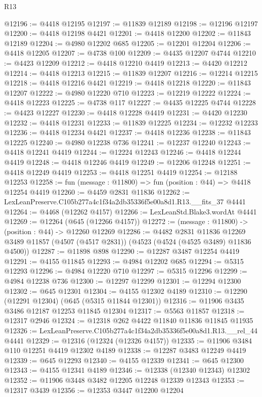 \begin{lexlean}{R13}
\begin{coremodule}
@12196 := @4418 @12195
@12197 := @11839 @12189
@12198 := @12196 @12197
@12200 := @4418 @12198 @4421
@12201 := @4418 @12200
@12202 := @11843 @12189
@12204 := @4980 @12202 @685
@12205 := @12201 @12204
@12206 := @4418 @12205
@12207 := @4738 @100
@12209 := @4435 @12207 @4744
@12210 := @4423 @12209
@12212 := @4418 @12210 @4419
@12213 := @4420 @12212
@12214 := @4418 @12213
@12215 := @11839 @12207
@12216 := @12214 @12215
@12218 := @4418 @12216 @4421
@12219 := @4418 @12218
@12220 := @11843 @12207
@12222 := @4980 @12220 @710
@12223 := @12219 @12222
@12224 := @4418 @12223
@12225 := @4738 @117
@12227 := @4435 @12225 @4744
@12228 := @4423 @12227
@12230 := @4418 @12228 @4419
@12231 := @4420 @12230
@12232 := @4418 @12231
@12233 := @11839 @12225
@12234 := @12232 @12233
@12236 := @4418 @12234 @4421
@12237 := @4418 @12236
@12238 := @11843 @12225
@12240 := @4980 @12238 @736
@12241 := @12237 @12240
@12243 := @4418 @12241 @4419
@12244 := @12224 @12243
@12246 := @4418 @12244 @4419
@12248 := @4418 @12246 @4419
@12249 := @12206 @12248
@12251 := @4418 @12249 @4419
@12253 := @4418 @12251 @4419
@12254 := @12188 @12253
@12258 := fun (message : @11800) => fun (position : @44) => @4418 @12254 @4419
@12260 := @4459 @2831 @11836
@12262 := LexLeanPreserve.C105b277a4c1f34a2db35336f5e00a8d1.R13.__fits_37 @4441
@12264 := @4468 (@12262 @4157)
@12266 := LexLeanStd.Blake3.wordAt @4441
@12269 := @12264 (@645 (@12266 @4157))
@12272 := (message : @11800) -> (position : @44) -> @12260 @12269
@12286 := @4482
    @2831
    @11836
    @12269
    @3489
    @11857
    (@4507 (@4517 @2831))
    (@4523 (@4524 (@4525 @3489) @11836 @4500))
@12287 := @11898 @898
@12290 := @12287 @3487 @12254 @4419
@12291 := @4155 @11845
@12293 := @4984 @12202 @685
@12294 := @5315 @12293
@12296 := @4984 @12220 @710
@12297 := @5315 @12296
@12299 := @4984 @12238 @736
@12300 := @12297 @12299
@12301 := @12294 @12300
@12302 := @645 @12301
@12304 := @4155 @12302 @4189
@12310 := @12290 (@12291 @12304) (@645 (@5315 @11844 @12301))
@12316 := @11906 @3435 @3486 @12187 @12253 @11845 @12304
@12317 := @5563 @11857
@12318 := @12317 @2946
@12324 := @12318 @262 @4422 @11840 @11836 @11845 @11935
@12326 := LexLeanPreserve.C105b277a4c1f34a2db35336f5e00a8d1.R13.__rel_44 @4441
@12329 := @12316 (@12324 (@12326 @4157))
@12335 := @11906 @3484 @110 @12251 @4419 @12302 @4189
@12338 := @12287 @3483 @12249 @4419
@12339 := @645 @12293
@12340 := @4155 @12339
@12341 := @645 @12300
@12343 := @4155 @12341 @4189
@12346 := @12338 (@12340 @12343) @12302
@12352 := @11906 @3448 @3482 @12205 @12248 @12339 @12343
@12353 := @12317 @3439
@12356 := @12353 @3447 @12200 @12204

\end{coremodule}
\end{lexlean}
